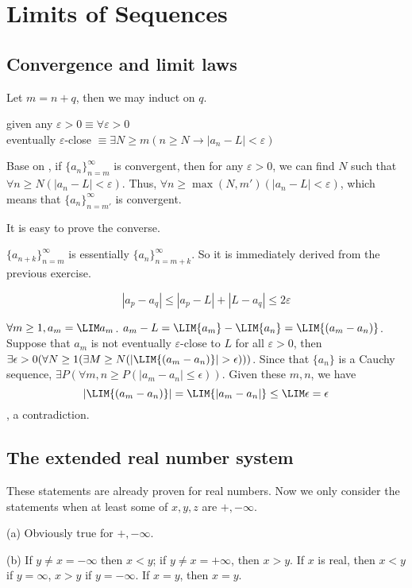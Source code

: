 \section{Limits of Sequences}
\subsection{Convergence and limit laws}
Let $m=n+q$, then we may induct on $q$.

\noindent given any $\varepsilon>0 \equiv \forall \varepsilon>0$\\
eventually $\varepsilon$-close $\equiv \exists N\geq m(n\geq N \to |a_n - L| <\varepsilon)$

Base on , if $\{a_n\}^\infty_{n=m}$ is convergent, then for any $\varepsilon>0$, we can find $N$ such that $\forall n\geq N( |a_n-L|<\varepsilon)$. Thus, $\forall n\geq \max(N,m') (|a_n-L|< \varepsilon)$, which means that $\{a_n\}^\infty_{n=m'}$ is convergent.

It is easy to prove the converse.

$\{a_{n+k}\}^\infty_{n=m}$ is essentially $\{a_{n}\}^\infty_{n=m+k}$. So it is immediately derived from the previous exercise.

\[
|a_p-a_q| \leq |a_p-L| + |L-a_q| \leq 2\varepsilon
\]

$\forall m \geq 1, a_m = \LIM a_m$. $a_m - L = \LIM{a_m} - \LIM{a_n} = \LIM{(a_m-a_n)}$. Suppose that $a_m$ is not eventually $\varepsilon$-close to $L$ for all $\varepsilon>0$, then $\exists \epsilon >0(\forall N \geq 1(\exists M \geq N(|\LIM{(a_m-a_n)}|>\epsilon)))$. Since that $\{a_n\}$ is a Cauchy sequence, $\exists P(\forall m,n\geq P(|a_m-a_n|\leq \epsilon))$. Given these $m,n$, we have
\[
|\LIM{(a_m-a_n)}| = \LIM{|a_m-a_n|} \leq \LIM \epsilon = \epsilon
\]
, a contradiction.

\subsection{The extended real number system}
These statements are already proven for real numbers. Now we only consider the statements when at least some of $x,y,z$ are $+,-\infty$.

(a) Obviously true for $+,-\infty$.

(b) If $y \ne x = - \infty$  then $x < y$; if $y \ne x = + \infty$, then $x > y$. If $x$ is real, then $x < y$ if $y = \infty$, $x > y$ if $y = -\infty$. If $x = y$, then $x = y$.

